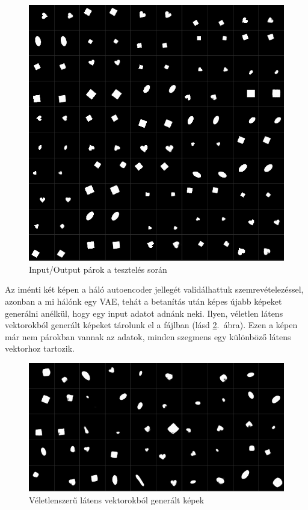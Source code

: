  \begin{figure}[h!]
\begin{center}
  
  
	\begin{center}
	\includegraphics[width=0.75\linewidth]{testpng.png}
	\end{center}
	
  \caption{Input/Output párok a tesztelés során}\label{testpng}
\end{center}
\end{figure}

Az iménti két képen a háló autoencoder jellegét validálhattuk szemrevételezéssel, azonban a mi hálónk egy VAE, tehát a betanítás után képes újabb képeket generálni anélkül, hogy egy input adatot adnánk neki. Ilyen, véletlen látens vektorokból generált képeket tárolunk el a  fájlban (lásd \ref{randompng}.~ábra). Ezen a képen már nem párokban vannak az adatok, minden szegmens egy különböző látens vektorhoz tartozik.

\begin{figure}[h!]
\begin{center}
  
  
	\begin{center}
	\includegraphics[width=0.75\linewidth]{randompng.png}
	\end{center}
	
  \caption{Véletlenszerű látens vektorokból generált képek}\label{randompng}
\end{center}
\end{figure}

